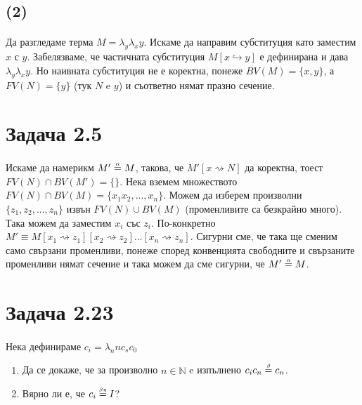 \documentclass[12pt]{article}
\begin{document}
\begin{enumerate}
\subsection*{(2)}
\paragraph*{}
Да разгледаме терма $M = \lambda_y \lambda_x y$. Искаме да направим субституция като заместим $x$ с $y$. Забелязваме, че частичната субституция $M[x \hookrightarrow y]$ е дефинирана и дава $\lambda_y \lambda_x y$. Но наивната субституция не е коректна, понеже $BV(M) = \{ x, y \}$, а $FV(N) = \{ y \}$ (тук $N$ e $y$) и съответно нямат празно сечение.

\end{enumerate}

\section*{Задача 2.5}
\paragraph*{}
Искаме да намерикм $M' \alphaeq M$, такова, че $M'[x \rightsquigarrow N]$ да коректна, тоест $FV(N) \cap BV(M') = \{ \}$. Нека вземем множеството $FV(N) \cap BV(M) = \{ x_1 x_2, ..., x_n\}$. Можем да изберем произволни $\{ z_1, z_2, ..., z_n \}$ извън $FV(N) \cup BV(M)$ (променливите са безкрайно много). Така можем да заместим $x_i$ със $z_i$. По-конкретно $M' \equiv M[x_1 \rightsquigarrow z_1][x_2 \rightsquigarrow z_2]...[x_n \rightsquigarrow z_n]$. Сигурни сме, че така ще сменим само свързани променливи, понеже според конвенцията свободните и свързаните променливи нямат сечение и така можем да сме сигурни, че $M' \alphaeq M$.

\section*{Задача 2.23}
\paragraph{}
Нека дефинираме $c_i = \lambda_n n c_s c_0$
\begin{enumerate}
	\item Да се докаже, че за произволно $n \in \mathbb{N}$ e изпълнено $c_i c_n \betaeq c_n$.
	\item Вярно ли е, че $c_i \betaetaeq I$?
\end{enumerate}
\end{document}
